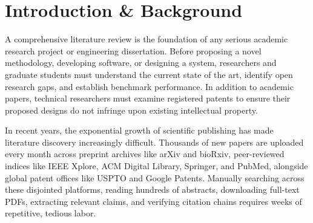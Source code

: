 \documentclass[11pt,a4paper]{article}
\begin{document}
\begin{abstract}
Conducting a comprehensive literature review is a critical yet time-consuming task for academic researchers and engineering students. While modern generative AI tools can summarize text, they frequently fabricate non-existent citations, provide dead links, and uncritically accept scientifically impossible queries. This project introduces \textbf{VERITAS} (\textbf{V}erified \textbf{E}vidence-based \textbf{R}esearch, \textbf{I}P \& \textbf{T}axonomy \textbf{A}utonomous \textbf{S}ystem), an autonomous multi-agent web platform for literature discovery and patent prior-art analysis. VERITAS employs specialized AI agents to verify research topic plausibility, apply the PRISMA 2020 systematic review protocol, search academic papers and patents concurrently, and validate all source links in real time via live HTTP status checks. The platform features an interactive split-pane web reader and exports publication-ready IEEE/ACM LaTeX documents, ensuring verifiable and hallucination-free academic research.
\end{abstract}

\section{Introduction \& Background}
A comprehensive literature review is the foundation of any serious academic research project or engineering dissertation. Before proposing a novel methodology, developing software, or designing a system, researchers and graduate students must understand the current state of the art, identify open research gaps, and establish benchmark performance. In addition to academic papers, technical researchers must examine registered patents to ensure their proposed designs do not infringe upon existing intellectual property.

In recent years, the exponential growth of scientific publishing has made literature discovery increasingly difficult. Thousands of new papers are uploaded every month across preprint archives like arXiv and bioRxiv, peer-reviewed indices like IEEE Xplore, ACM Digital Library, Springer, and PubMed, alongside global patent offices like USPTO and Google Patents. Manually searching across these disjointed platforms, reading hundreds of abstracts, downloading full-text PDFs, extracting relevant claims, and verifying citation chains requires weeks of repetitive, tedious labor.
\end{document}
